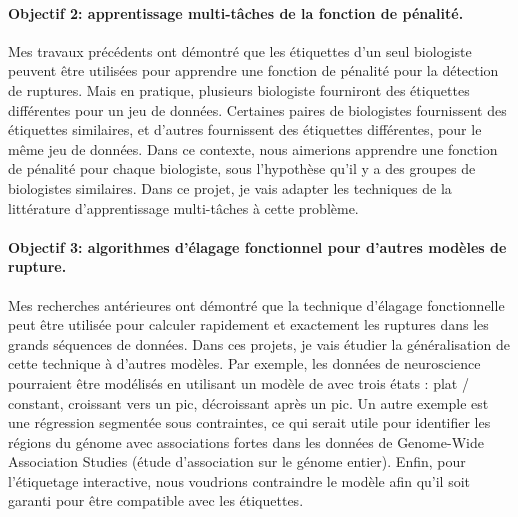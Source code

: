 \documentclass{article}
\begin{document}
\paragraph{Objectif 2: apprentissage multi-tâches de la fonction de
  pénalité.} Mes travaux précédents ont démontré que les étiquettes
d'un seul biologiste peuvent être utilisées pour apprendre une
fonction de pénalité pour la détection de ruptures. Mais en pratique,
plusieurs biologiste fourniront des étiquettes différentes pour un jeu
de données. Certaines paires de biologistes fournissent des étiquettes
similaires, et d'autres fournissent des étiquettes différentes, pour
le même jeu de données. Dans ce contexte, nous aimerions apprendre une
fonction de pénalité pour chaque biologiste, sous l'hypothèse qu'il y
a des groupes de biologistes similaires. Dans ce projet, je vais
adapter les techniques de la littérature d'apprentissage multi-tâches
à cette problème.

\paragraph{Objectif 3: algorithmes d'élagage fonctionnel pour
  d'autres modèles de rupture.} Mes recherches antérieures ont
démontré que la technique d'élagage fonctionnelle peut être utilisée
pour calculer rapidement et exactement les ruptures dans les grands
séquences de données. Dans ces projets, je vais étudier la
généralisation de cette technique à d'autres modèles. Par exemple, les
données de neuroscience pourraient être modélisés en utilisant un
modèle de avec trois états : plat / constant, croissant vers un pic,
décroissant après un pic. Un autre exemple est une régression
segmentée sous contraintes, ce qui serait utile pour identifier les
régions du génome avec associations fortes dans les données de
Genome-Wide Association Studies (étude d'association sur le génome
entier). Enfin, pour l'étiquetage interactive, nous voudrions
contraindre le modèle afin qu'il soit garanti pour être compatible
avec les étiquettes.
\end{document}
